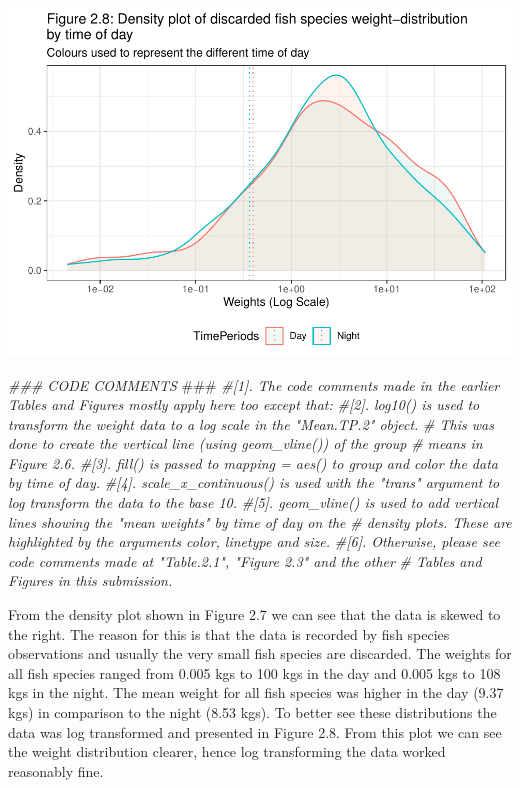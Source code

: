 \documentclass[
]{book}
\newenvironment{Shaded}{\begin{snugshade}}{\end{snugshade}}
\newcommand{\AlertTok}[1]{\textcolor[rgb]{0.94,0.16,0.16}{#1}}
\newcommand{\CommentTok}[1]{\textcolor[rgb]{0.56,0.35,0.01}{\textit{#1}}}
\begin{document}
\begin{center}\includegraphics{bookdown-demo_files/figure-latex/unnamed-chunk-19-2} \end{center}

\begin{Shaded}
\begin{Highlighting}[]
\CommentTok{### CODE COMMENTS }\AlertTok{###}
\CommentTok{#[1]. The code comments made in the earlier Tables and Figures mostly apply here too except that: }
\CommentTok{#[2]. log10() is used to transform the weight data to a log scale in the "Mean.TP.2" object. }
\CommentTok{#     This was done to create the vertical line (using geom_vline()) of the group }
\CommentTok{#     means in Figure 2.6. }
\CommentTok{#[3]. fill() is passed to mapping = aes() to group and color the data by time of day. }
\CommentTok{#[4]. scale_x_continuous() is used with the "trans" argument to log transform the data to the base 10. }
\CommentTok{#[5]. geom_vline() is used to add vertical lines showing the "mean weights" by time of day on the }
\CommentTok{#     density plots. These are highlighted by the arguments color, linetype and size.  }
\CommentTok{#[6]. Otherwise, please see code comments made at "Table.2.1", "Figure 2.3" and the other}
\CommentTok{#     Tables and Figures in this submission. }
\end{Highlighting}
\end{Shaded}

From the density plot shown in Figure 2.7 we can see that the data is skewed to the right. The reason for this is that the data is recorded by fish species observations and usually the very small fish species are discarded. The weights for all fish species ranged from 0.005 kgs to 100 kgs in the day and 0.005 kgs to 108 kgs in the night. The mean weight for all fish species was higher in the day (9.37 kgs) in comparison to the night (8.53 kgs). To better see these distributions the data was log transformed and presented in Figure 2.8. From this plot we can see the weight distribution clearer, hence log transforming the data worked reasonably fine.
\end{document}
